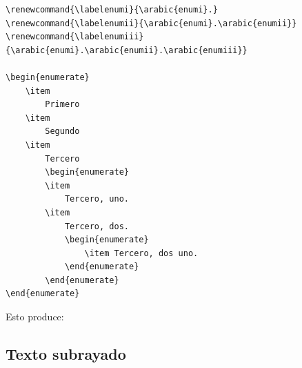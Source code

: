 \documentclass[a4,10pt]{aleph-notas}
\begin{document}
\begin{lstlisting}[frame=single]
\renewcommand{\labelenumi}{\arabic{enumi}.}
\renewcommand{\labelenumii}{\arabic{enumi}.\arabic{enumii}}
\renewcommand{\labelenumiii}{\arabic{enumi}.\arabic{enumii}.\arabic{enumiii}}

\begin{enumerate}
    \item
        Primero
    \item
        Segundo
    \item
        Tercero
        \begin{enumerate}
        \item
            Tercero, uno.
        \item
            Tercero, dos.
            \begin{enumerate}
                \item Tercero, dos uno.
            \end{enumerate}
        \end{enumerate}
\end{enumerate}
\end{lstlisting}

\noindent
Esto produce:

\begin{center}
{ \fboxsep 12pt
 }
\end{center}

\subsection{Texto subrayado}
\end{document}
